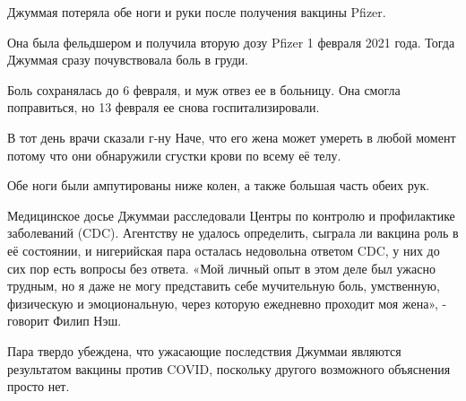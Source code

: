 Джуммая потеряла обе ноги и руки после получения вакцины Pfizer.

Она была фельдшером и получила вторую дозу Pfizer 1 февраля 2021 года. Тогда
Джуммая сразу почувствовала боль в груди.

Боль сохранялась до 6 февраля, и муж отвез ее в больницу. Она смогла
поправиться, но 13 февраля ее снова госпитализировали.

В тот день врачи сказали г-ну Наче, что его жена может умереть в любой момент
потому что они обнаружили сгустки крови по всему её телу.

Обе ноги были ампутированы ниже колен, а также большая часть обеих рук.

Медицинское досье Джуммаи расследовали Центры по контролю и профилактике
заболеваний (CDC). Агентству не удалось определить, сыграла ли вакцина роль в её
состоянии, и нигерийская пара осталась недовольна ответом CDC, у них до сих пор
есть вопросы без ответа. «Мой личный опыт в этом деле был ужасно трудным, но я
даже не могу представить себе мучительную боль, умственную, физическую и
эмоциональную, через которую ежедневно проходит моя жена», - говорит Филип Нэш.

Пара твердо убеждена, что ужасающие последствия Джуммаи являются результатом
вакцины против COVID, поскольку другого возможного объяснения просто нет.

